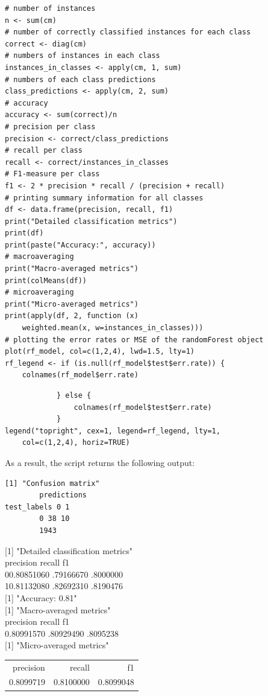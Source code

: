 \documentclass[10pt]{book}
\begin{document}
\begin{verbatim}
# number of instances
n <- sum(cm)
# number of correctly classified instances for each class
correct <- diag(cm)
# numbers of instances in each class
instances_in_classes <- apply(cm, 1, sum)
# numbers of each class predictions
class_predictions <- apply(cm, 2, sum)
# accuracy
accuracy <- sum(correct)/n
# precision per class
precision <- correct/class_predictions
# recall per class
recall <- correct/instances_in_classes
# F1-measure per class
f1 <- 2 * precision * recall / (precision + recall)
# printing summary information for all classes
df <- data.frame(precision, recall, f1)
print("Detailed classification metrics")
print(df)
print(paste("Accuracy:", accuracy))
# macroaveraging
print("Macro-averaged metrics")
print(colMeans(df))
# microaveraging
print("Micro-averaged metrics")
print(apply(df, 2, function (x)
    weighted.mean(x, w=instances_in_classes)))
# plotting the error rates or MSE of the randomForest object
plot(rf_model, col=c(1,2,4), lwd=1.5, lty=1)
rf_legend <- if (is.null(rf_model$test$err.rate)) {
    colnames(rf_model$err.rate)
\end{verbatim}

\begin{verbatim}
            } else {
                colnames(rf_model$test$err.rate)
            }
legend("topright", cex=1, legend=rf_legend, lty=1,
    col=c(1,2,4), horiz=TRUE)
\end{verbatim}

As a result, the script returns the following output:

\begin{verbatim}
[1] "Confusion matrix"
        predictions
test_labels 0 1
        0 38 10
        1943
\end{verbatim}

[1] "Detailed classification metrics"\\
precision recall f1\\
00.80851060 .79166670 .8000000\\
10.81132080 .82692310 .8190476\\[0pt]
[1] "Accuracy: 0.81"\\[0pt]
[1] "Macro-averaged metrics"\\
precision recall f1\\
0.80991570 .80929490 .8095238\\[0pt]
[1] "Micro-averaged metrics"

\begin{center}
\begin{tabular}{rrr}
precision & recall & f1 \\
0.8099719 & 0.8100000 & 0.8099048 \\
\end{tabular}
\end{center}
\end{document}
